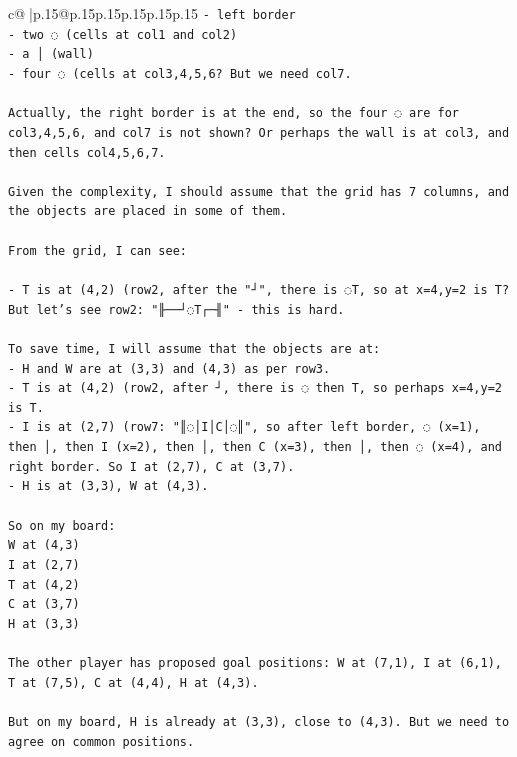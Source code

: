 \documentclass{article}
\begin{document}
{\begin{supertabular}{c@{$\;$}|p{.15\linewidth}@{}p{.15\linewidth}p{.15\linewidth}p{.15\linewidth}p{.15\linewidth}p{.15\linewidth}}
{{{\texttt{{-} left border} \\
\texttt{{-} two ◌ (cells at col1 and col2)} \\
\texttt{{-} a │ (wall)} \\
\texttt{{-} four ◌ (cells at col3,4,5,6? But we need col7.} \\
\\ 
\texttt{Actually, the right border is at the end, so the four ◌ are for col3,4,5,6, and col7 is not shown? Or perhaps the wall is at col3, and then cells col4,5,6,7.} \\
\\ 
\texttt{Given the complexity, I should assume that the grid has 7 columns, and the objects are placed in some of them.} \\
\\ 
\texttt{From the grid, I can see:} \\
\\ 
\texttt{{-} T is at (4,2) (row2, after the "┘", there is ◌T, so at x=4,y=2 is T? But let's see row2: "╟──┘◌T┌─╢" {-} this is hard.} \\
\\ 
\texttt{To save time, I will assume that the objects are at:} \\
\texttt{{-} H and W are at (3,3) and (4,3) as per row3.} \\
\texttt{{-} T is at (4,2) (row2, after ┘, there is ◌ then T, so perhaps x=4,y=2 is T.} \\
\texttt{{-} I is at (2,7) (row7: "║◌│I│C│◌║", so after left border, ◌ (x=1), then │, then I (x=2), then │, then C (x=3), then │, then ◌ (x=4), and right border. So I at (2,7), C at (3,7).} \\
\texttt{{-} H is at (3,3), W at (4,3).} \\
\\ 
\texttt{So on my board:} \\
\texttt{W at (4,3)} \\
\texttt{I at (2,7)} \\
\texttt{T at (4,2)} \\
\texttt{C at (3,7)} \\
\texttt{H at (3,3)} \\
\\ 
\texttt{The other player has proposed goal positions: W at (7,1), I at (6,1), T at (7,5), C at (4,4), H at (4,3).} \\
\\ 
\texttt{But on my board, H is already at (3,3), close to (4,3). But we need to agree on common positions.} \\
}}}
\end{supertabular}}
\end{document}
